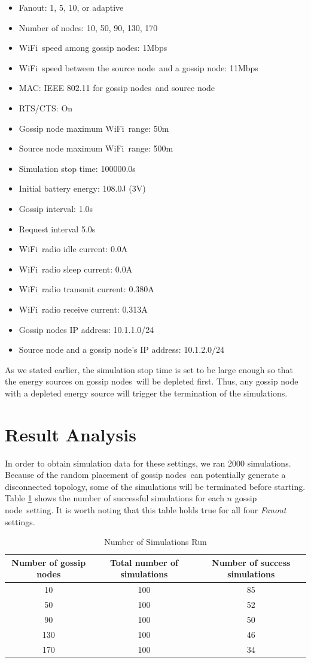 \documentclass[onehalf,11pt]{beavtex}
\newcommand{\gn}{gossip node}
\newcommand{\gns}{gossip nodes}
\newcommand{\wf}{WiFi}
\newcommand{\sn}{source node}
\begin{document}
\begin{itemize}
	\item Fanout: 1, 5, 10, or adaptive
	\item Number of nodes: 10, 50, 90, 130, 170
	\item \wf ~speed among \gns: 1Mbps
	\item \wf ~speed between the \sn ~and a \gn: 11Mbps
	\item MAC: IEEE 802.11 for \gns ~and \sn
	\item RTS/CTS: On
	\item Gossip node maximum \wf ~range: 50m
	\item Source node maximum \wf ~range: 500m
	\item Simulation stop time: 100000.0s
	\item Initial battery energy: 108.0J  (3V)
	\item Gossip interval: 1.0s
	\item Request interval 5.0s
	\item \wf ~radio idle current: 0.0A
	\item \wf ~radio sleep current: 0.0A
	\item \wf ~radio transmit current: 0.380A
	\item \wf ~radio receive current: 0.313A
	\item Gossip nodes IP address: 10.1.1.0/24
	\item Source node and a \gn's IP address: 10.1.2.0/24	
\end{itemize}

As we stated earlier, the simulation stop time is set to be large enough so that the energy sources on \gns ~will be depleted first. Thus, any gossip node with a depleted energy source will trigger the termination of the simulations. 

\section{Result Analysis}

In order to obtain simulation data for these settings, we ran 2000 simulations. Because of the random placement of \gns ~can potentially generate a disconnected topology, some of the simulations will be terminated before starting. Table \ref{table:sim} shows the number of successful simulations for each $n$ \gn ~setting. It is worth noting that this table holds true for all four \emph{Fanout} settings.

\begin{table}[h]
	\centering
	\caption{Number of Simulations Run}
	\label{table:sim}
	\begin{tabular}{|c|c|c|}
		\hline 
		Number of gossip nodes & Total number of simulations & Number of success simulations \\ 
		\hline 
		10 & 100 & 85 \\ 
		\hline 
		50 & 100 & 52 \\ 
		\hline 
		90 & 100 & 50 \\ 
		\hline 
		130 & 100 & 46 \\ 
		\hline 
		170 & 100 & 34 \\ 
		\hline 
	\end{tabular} 
\end{table}
\end{document}
